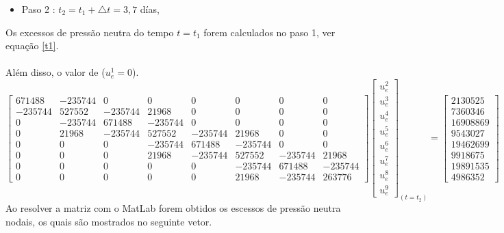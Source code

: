 \documentclass{article} %
\begin{document}
\begin{itemize}
	\item Paso 2 : \(t_2=t_1+\triangle t=3,7\) días,
\end{itemize}

Os excessos de pressão neutra do tempo \(t=t_1\) forem calculados no paso 1, ver equação \ref{t1}.\\
\\
\indent Além disso, o valor de (\(u_e^1=0\)).\\

\begin{equation*}
\begin{bmatrix}
671488& -235744& 0& 0& 0& 0& 0& 0\\
-235744&527552&-235744&21968& 0& 0& 0& 0\\
0&-235744&671488&-235744& 0& 0& 0& 0\\
0&21968&-235744&527552&-235744&21968& 0& 0\\
0&0&0& -235744&671488&-235744& 0& 0\\
0&0&0&21968&-235744&527552&-235744&21968\\
0&0&0&0&0&-235744&671488&-235744\\
0&0&0&0&0&21968&-235744&263776
\end{bmatrix}\begin{bmatrix}
u_e^2\\
u_e^3\\
u_e^4\\
u_e^5\\
u_e^6\\
u_e^7\\
u_e^8\\
u_e^9
\end{bmatrix}_{(t=t_2)}
=\begin{bmatrix}
2130525\\
7360346\\
16908869\\
9543027\\
19462699\\
9918675\\
19891535\\
4986352
\end{bmatrix}
\end{equation*}
\indent Ao resolver a matriz com o MatLab forem obtidos os escessos de pressão neutra nodais, os quais são mostrados no seguinte vetor.
\end{document}
